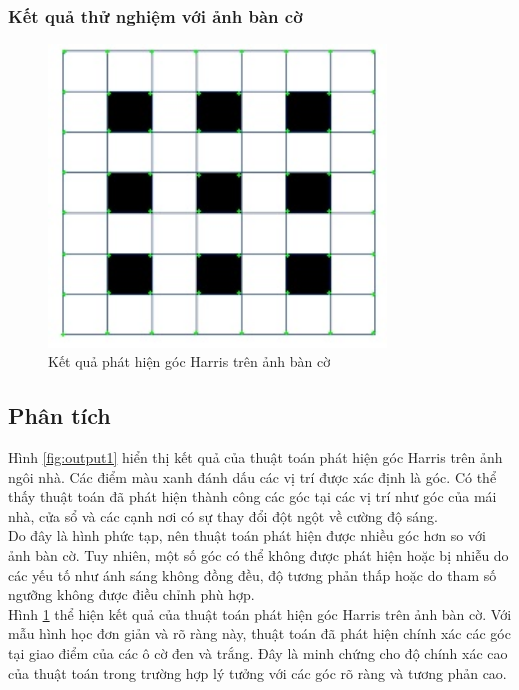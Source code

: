 \documentclass[12pt]{article}
\begin{document}
\subsubsection{Kết quả thử nghiệm với ảnh bàn cờ}

\begin{figure}[H]
    \centering
    \includegraphics[width=0.8\textwidth]{img/output2.jpg}
    \caption{Kết quả phát hiện góc Harris trên ảnh bàn cờ}
    \label{fig:output2}
\end{figure}

\subsection{Phân tích}

Hình \ref{fig:output1} hiển thị kết quả của thuật toán phát hiện góc Harris trên ảnh ngôi nhà. Các điểm màu xanh đánh dấu các vị trí được xác định là góc. Có thể thấy thuật toán đã phát hiện thành công các góc tại các vị trí như góc của mái nhà, cửa sổ và các cạnh nơi có sự thay đổi đột ngột về cường độ sáng.\\
Do đây là hình phức tạp, nên thuật toán phát hiện được nhiều góc hơn so với ảnh bàn cờ. Tuy nhiên, một số góc có thể không được phát hiện hoặc bị nhiễu do các yếu tố như ánh sáng không đồng đều, độ tương phản thấp hoặc do tham số ngưỡng không được điều chỉnh phù hợp.\\
Hình \ref{fig:output2} thể hiện kết quả của thuật toán phát hiện góc Harris trên ảnh bàn cờ. Với mẫu hình học đơn giản và rõ ràng này, thuật toán đã phát hiện chính xác các góc tại giao điểm của các ô cờ đen và trắng. Đây là minh chứng cho độ chính xác cao của thuật toán trong trường hợp lý tưởng với các góc rõ ràng và tương phản cao.
\end{document}
